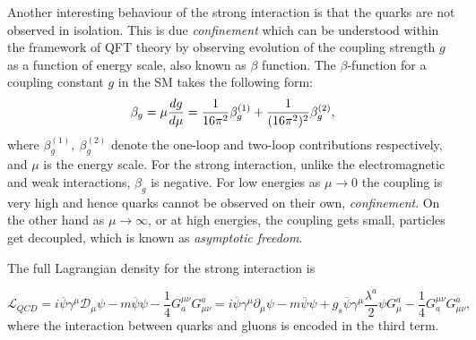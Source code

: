 Another interesting behaviour of the strong interaction is that the quarks are not observed in isolation. This is due \textit{confinement} which can be understood within the framework of \gls{QFT} theory by observing evolution of the coupling strength $g$ as a function of energy scale, also known as $\beta$ function.
The $\beta$-function for a coupling constant $g$ in the \gls{SM} takes the following form:
\begin{equation}
\beta_g = \mu {{d g}\over d \mu} = {1\over16\pi^2} \beta_g^{(1)}
+ {1\over(16\pi^2)^2} \beta_g^{(2)},
\end{equation}
where $\beta_g^{(1)},~ \beta_g^{(2)}$ denote the one-loop and two-loop
contributions respectively, and $\mu$ is the energy scale. For the strong interaction, unlike the electromagnetic and weak interactions, $\beta_g$ is negative. For low energies as $\mu \rightarrow 0$ the coupling is very high and hence quarks cannot be observed on their own, \textit{confinement}. On the other hand as $\mu \rightarrow \infty$, or at high energies, the coupling gets small, particles get decoupled, which is known as \textit{asymptotic freedom}. 

The full Lagrangian density for the strong interaction is

\begin{equation}
	\mathcal{L}_{QCD} = i\overline{\psi}\gamma^{\mu}\mathcal{D}_{\mu}\psi - m\overline{\psi}\psi -\frac{1}{4} G_{a}^{\mu\nu}G^{a}_{\mu\nu} = i\overline{\psi}\gamma^{\mu}\partial_{\mu}\psi - m\overline{\psi}\psi + g_{s}\overline{\psi}\gamma^{\mu}\frac{\lambda^{a}}{2}\psi G^{a}_{\mu} -\frac{1}{4} G_{a}^{\mu\nu}G^{a}_{\mu\nu},
\label{eq:lag_fourth}
\end{equation}
where the interaction between quarks and gluons is encoded in the third term.


